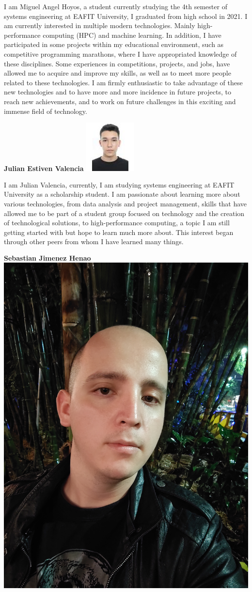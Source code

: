 \documentclass[11pt,a4paper,twocolumn]{article}
\begin{document}
I am Miguel Angel Hoyos, a student currently studying the 4th semester of systems engineering at EAFIT University, I graduated from high school in 2021. I am currently interested in multiple modern technologies. Mainly high-performance computing (HPC) and machine learning. In addition, I have participated in some projects within my educational environment, such as competitive programming marathons, where I have appropriated knowledge of these disciplines. Some experiences in competitions, projects, and jobs, have allowed me to acquire and improve my skills, as well as to meet more people related to these technologies. I am firmly enthusiastic to take advantage of these new technologies and to have more and more incidence in future projects, to reach new achievements, and to work on future challenges in this exciting and immense field of technology.

\begin{center}
    \textbf{Julian Estiven Valencia}
	\includegraphics[width = .45\linewidth]{Images/Julian Valencia.jpeg}
\end{center}

I am Julian Valencia, currently, I am studying systems engineering at EAFIT University as a scholarship student. I am passionate about learning more about various technologies, from data analysis and project management, skills that have allowed me to be part of a student group focused on technology and the creation of technological solutions, to high-performance computing, a topic I am still getting started with but hope to learn much more about. This interest began through other peers from whom I have learned many things.

\begin{center}
    \textbf{Sebastian Jimenez Henao}
	\includegraphics[width = .45\linewidth]{Images/Sebastian Henao.jpg}
\end{center}
\end{document}
